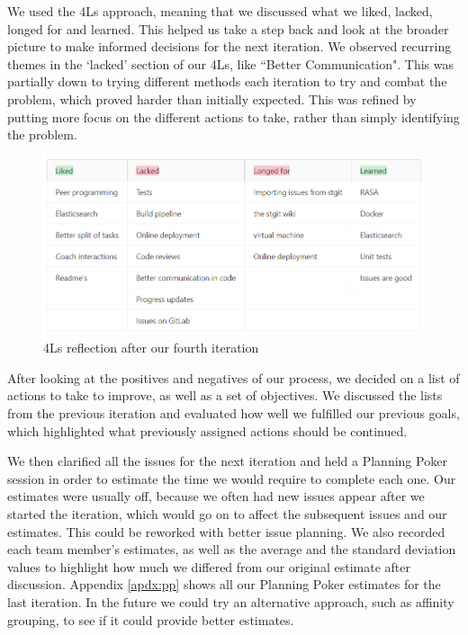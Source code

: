 \documentclass{l3proj}
\begin{document}
We used the 4Ls approach, meaning that we discussed what we liked, lacked, longed for and learned. This helped us take a step back and look at the broader picture to make informed decisions for the next iteration. We observed recurring themes in the `lacked' section of our 4Ls, like ``Better Communication". This was partially down to trying different methods each iteration to try and combat the problem, which proved harder than initially expected. This was refined by putting more focus on the different actions to take, rather than simply identifying the problem.

\begin{figure}[h!]
    \centering
    \includegraphics[width=0.85\linewidth]{figures/Process_Improvement.png}
    \caption{4Ls reflection after our fourth iteration}
\end{figure}

After looking at the positives and negatives of our process, we decided on a list of actions to take to improve, as well as a set of objectives. We discussed the lists from the previous iteration and evaluated how well we fulfilled our previous goals, which highlighted what previously assigned actions should be continued.

We then clarified all the issues for the next iteration and held a Planning Poker session in order to estimate the time we would require to complete each one. Our estimates were usually off, because we often had new issues appear after we started the iteration, which would go on to affect the subsequent issues and our estimates. This could be reworked with better issue planning. We also recorded each team member's estimates, as well as the average and the standard deviation values to highlight how much we differed from our original estimate after discussion. Appendix \ref{apdx:pp} shows all our Planning Poker estimates for the last iteration. In the future we could try an alternative approach, such as affinity grouping\cite{agileestimationtechniques:Sliger}, to see if it could provide better estimates.
\end{document}
